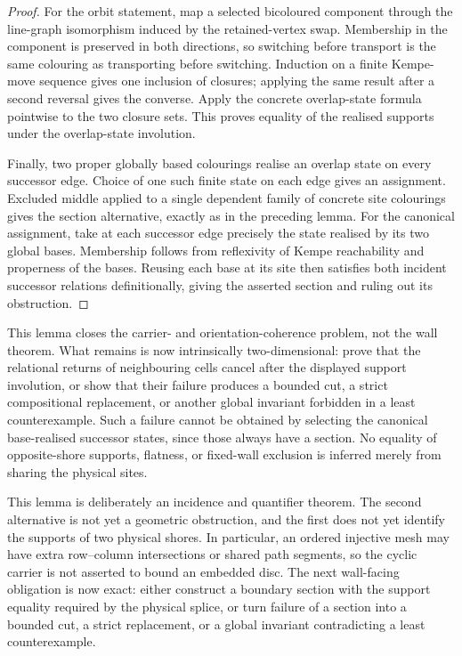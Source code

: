 \begin{proof}
For the orbit statement, map a selected bicoloured component through the
line-graph isomorphism induced by the retained-vertex swap.  Membership in the
component is preserved in both directions, so switching before transport is
the same colouring as transporting before switching.  Induction on a finite
Kempe-move sequence gives one inclusion of closures; applying the same result
after a second reversal gives the converse.  Apply the concrete overlap-state
formula pointwise to the two closure sets.  This proves equality of the
realised supports under the overlap-state involution.

Finally, two proper globally based colourings realise an overlap state on
every successor edge.  Choice of one such finite state on each edge gives an
assignment.  Excluded middle applied to a single dependent family of concrete
site colourings gives the section alternative, exactly as in the preceding
lemma.  For the canonical assignment, take at each successor edge precisely
the state realised by its two global bases.  Membership follows from
reflexivity of Kempe reachability and properness of the bases.  Reusing each
base at its site then satisfies both incident successor relations
definitionally, giving the asserted section and ruling out its obstruction.
\end{proof}

This lemma closes the carrier- and orientation-coherence problem, not the wall
theorem.  What remains is now intrinsically two-dimensional: prove that the
relational returns of neighbouring cells cancel after the displayed support
involution,
or show that their failure produces a bounded cut, a strict compositional
replacement, or another global invariant forbidden in a least
counterexample.  Such a failure cannot be obtained by selecting the canonical
base-realised successor states, since those always have a section.  No
equality of opposite-shore supports, flatness, or fixed-wall exclusion is
inferred merely from sharing the physical sites.

This lemma is deliberately an incidence and quantifier theorem.  The second
alternative is not yet a geometric obstruction, and the first does not yet
identify the supports of two physical shores.  In particular, an ordered
injective mesh may have extra row--column intersections or shared path
segments, so the cyclic carrier is not asserted to bound an embedded disc.
The next wall-facing obligation is now exact: either construct a boundary
section with the support equality required by the physical splice, or turn
failure of a section into a bounded cut, a strict replacement, or a global
invariant contradicting a least counterexample.

